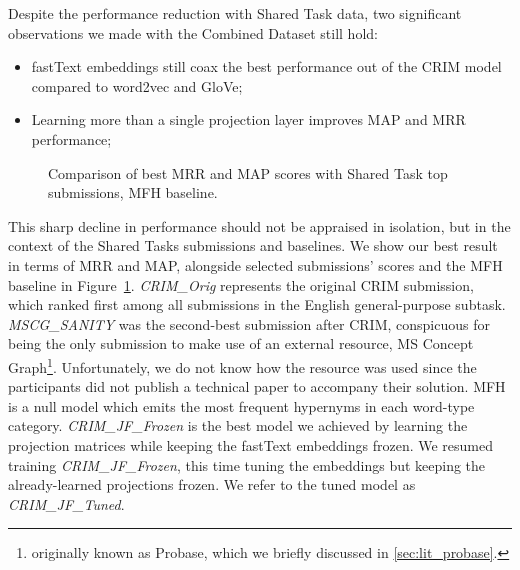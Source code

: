 Despite the performance reduction with Shared Task data, two significant observations we made with the Combined Dataset still hold:
\begin{itemize}
    \item fastText embeddings still coax the best performance out of the CRIM model compared to word2vec and GloVe;
    \item Learning more than a single projection layer improves \ac{MAP} and \ac{MRR} performance;
\end{itemize}
\begin{figure}[!ht]
    \centering
    \qquad
    \caption{Comparison of best MRR and MAP scores with Shared Task top submissions, MFH baseline.}        
    \label{fig:jf_official_results}
\end{figure}
This sharp decline in performance should not be appraised in isolation, but in the context of the Shared Tasks submissions and baselines.  We show our best result in terms of \ac{MRR} and \ac{MAP}, alongside selected submissions' scores and the \ac{MFH} baseline in Figure~\ref{fig:jf_official_results}.  \textit{CRIM\_Orig} represents the original CRIM submission, which ranked first among all submissions in the English general-purpose subtask.  \textit{MSCG\_SANITY} was the second-best submission after CRIM, conspicuous for being the only submission to make use of an external resource, MS Concept Graph\footnote{originally known as Probase, which we briefly discussed in \cref{sec:lit_probase}.}.  Unfortunately, we do not know how the resource was used since the participants did not publish a technical paper to accompany their solution.  \ac{MFH} is a null model which emits the most frequent hypernyms in each word-type category.  \textit{CRIM\_JF\_Frozen} is the best model we achieved by learning the projection matrices while keeping the fastText embeddings frozen.  We resumed training \textit{CRIM\_JF\_Frozen}, this time tuning the embeddings but keeping the already-learned projections frozen.  We refer to the tuned model as \textit{CRIM\_JF\_Tuned}. 

